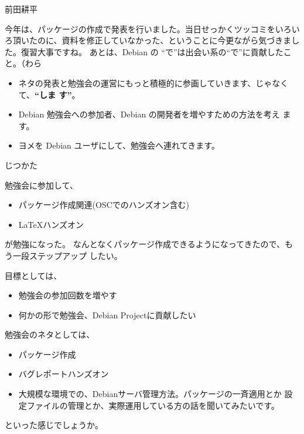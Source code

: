 \begin{prework}{前田耕平}

今年は、パッケージの作成で発表を行いました。当日せっかくツッコミをいろい
ろ頂いたのに、資料を修正していなかった、ということに今更ながら気づきまし
た。復習大事ですね。
あとは、Debian の ``で''は出会い系の``で''に貢献したこと。（わら

\begin{itemize}
 \item ネタの発表と勉強会の運営にもっと積極的に参画していきます、じゃなくて、\textbf{``しま
す''}。
 \item Debian 勉強会への参加者、Debian の開発者を増やすための方法を考え
       ます。
 \item ヨメを Debian ユーザにして、勉強会へ連れてきます。
\end{itemize}

\end{prework}
\begin{prework}{じつかた}


勉強会に参加して、

\begin{itemize}
 \item パッケージ作成関連(OSCでのハンズオン含む)
 \item \LaTeX{}ハンズオン
\end{itemize}
が勉強になった。
なんとなくパッケージ作成できるようになってきたので、もう一段ステップアップ
したい。


目標としては、
\begin{itemize}
 \item 勉強会の参加回数を増やす
 \item 何かの形で勉強会、Debian Projectに貢献したい
\end{itemize}

勉強会のネタとしては、
\begin{itemize}
 \item パッケージ作成
 \item バグレポートハンズオン
 \item 大規模な環境での、Debianサーバ管理方法。パッケージの一斉適用とか
       設定ファイルの管理とか、実際運用している方の話を聞いてみたいです。
\end{itemize}
といった感じでしょうか。

\end{prework}
